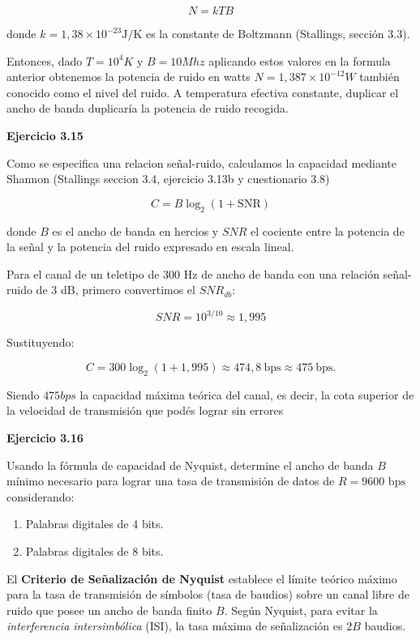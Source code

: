 \documentclass[11pt,a4paper]{article}
\begin{document}
$$N=kTB$$

donde $k=1,38\times10^{-23}\text{J/K}$ es la constante de Boltzmann (Stallings, sección 3.3).

Entonces, dado $T=10^4K$ y $B=10Mhz$ aplicando estos valores en la formula anterior obtenemos la potencia de ruido en watts $\boxed{N=1,387\times10^{-12}W}$ también conocido como el nivel del ruido. A temperatura efectiva constante, duplicar el ancho de banda duplicaría la potencia de ruido recogida. 

\vspace{0.3cm}
\noindent\textbf{Ejercicio 3.15}\par
Como se especifica una relacion señal-ruido, calculamos la capacidad mediante Shannon (Stallings seccion 3.4, ejercicio 3.13b y cuestionario 3.8) 

\[
  C = B\log_2\!\left(1+\mathrm{SNR}\right) 
\]

donde $B$ es el ancho de banda en hercios y $SNR$ el cociente entre la potencia de la señal y la potencia del ruido expresado en escala lineal.

Para el canal de un teletipo de 300 Hz de ancho de banda con una relación señal-ruido de 3 dB, primero convertimos el $SNR_{db}$:

$$SNR=10^{3/10}\approx1,995$$

Sustituyendo:

$$C=300\log_2(1+1,995)\approx\boxed{474,8\ \mathrm{bps}\approx475\ \mathrm{bps}}.$$

Siendo $475bps$ la capacidad máxima teórica del canal, es decir, la cota superior de la velocidad de transmisión que podés lograr sin errores

\vspace{0.3cm}
\noindent\textbf{Ejercicio 3.16}\par
Usando la fórmula de capacidad de Nyquist, determine el ancho de banda $B$ mínimo necesario para lograr una tasa de transmisión de datos de $R = 9600\text{ bps}$ considerando:
\begin{enumerate}
    \item[a)] Palabras digitales de 4 bits.
    \item[b)] Palabras digitales de 8 bits.
\end{enumerate}

El \textbf{Criterio de Señalización de Nyquist} establece el límite teórico máximo para la tasa de transmisión de símbolos (tasa de baudios) sobre un canal libre de ruido que posee un ancho de banda finito $B$. Según Nyquist, para evitar la \textit{interferencia intersimbólica} (ISI), la tasa máxima de señalización es $2B$ baudios.
\end{document}

